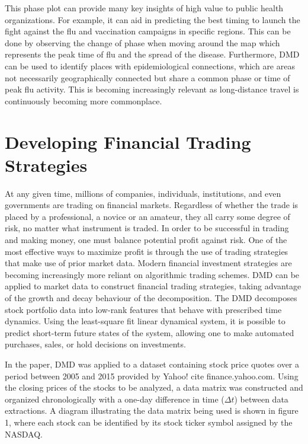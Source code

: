 \documentclass[12pt]{report}
\begin{document}
This phase plot can provide many key insights of high value to public health organizations. For example, it can aid in predicting the best timing to launch the fight against the flu and vaccination campaigns in specific regions. This can be done by observing the change of phase when moving around the map which represents the peak time of flu and the spread of the disease. Furthermore, DMD can be used to identify places with epidemiological connections, which are areas not necessarily geographically connected but share a common phase or time of peak flu activity. This is becoming increasingly relevant as long-distance travel is continuously becoming more commonplace.

\section{Developing Financial Trading Strategies}

At any given time, millions of companies, individuals, institutions, and even governments are trading on financial markets. Regardless of whether the trade is placed by a professional, a novice or an amateur, they all carry some degree of risk, no matter what instrument is traded. In order to be successful in trading and making money, one must balance potential profit against risk. One of the most effective ways to maximize profit is through the use of trading strategies that make use of prior market data. Modern financial investment strategies are becoming increasingly more reliant on algorithmic trading schemes. DMD can be applied to market data to construct financial trading strategies, taking advantage of the growth and decay behaviour of the decomposition. The DMD decomposes stock portfolio data into low-rank features that behave with prescribed time dynamics. Using the least-square fit linear dynamical system, it is possible to predict short-term future states of the system, allowing one to make automated purchases, sales, or hold decisions on investments.

In the paper, \cite{Financial} DMD was applied to a dataset containing stock price quotes over a period between 2005 and 2015 provided by Yahoo! cite finance.yahoo.com. Using the closing prices of the stocks to be analyzed, a data matrix was constructed and organized chronologically with a one-day difference in time ($\Delta{t}$) between data extractions. A diagram illustrating the data matrix being used is shown in figure 1, where each stock can be identified by its stock ticker symbol assigned by the NASDAQ.
\end{document}
